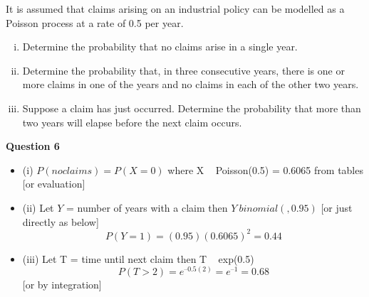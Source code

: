 \documentclass[a4paper,12pt]{article}
\begin{document}
\large 
\noindent

It is assumed that claims arising on an industrial policy can be modelled as a Poisson process at a rate of 0.5 per year.

\begin{enumerate}[(i)]
\item Determine the probability that no claims arise in a single year.

\item Determine the probability that, in three consecutive years, there is one or more
claims in one of the years and no claims in each of the other two years.

\item Suppose a claim has just occurred. Determine the probability that more than
two years will elapse before the next claim occurs.
\end{enumerate}



\noindent \textbf{Question 6}
\begin{itemize}
\item (i) $P(no claims) = P(X = 0)$ where X ~ Poisson(0.5)
= 0.6065 from tables [or evaluation]
\item (ii) Let $Y$ = number of years with a claim
then $Y ~ binomial(,0.95)$ [or just directly as below]
\[P(Y = 1) = (0.95)(0.6065)^2 = 0.44\]
\item (iii)
Let T = time until next claim
then T ~ exp(0.5)
\[P(T > 2) = e^{ –0.5(2)} 
 = e^{ –1} = 0.68\]
 [or by integration]
\end{itemize}
\end{document}
